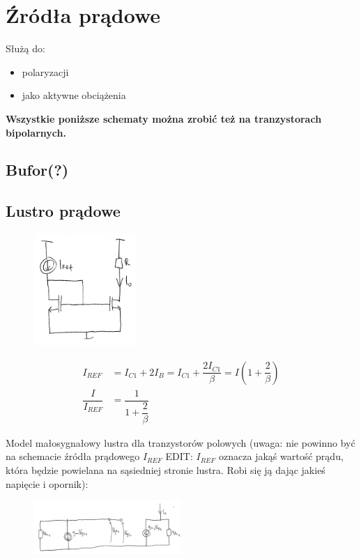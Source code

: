 \documentclass[10pt,a4paper]{article}
\begin{document}
\section{Źródła prądowe}
Służą do:
\begin{itemize}
\item{polaryzacji}
\item{jako aktywne obciążenia}
\end{itemize}
\textbf{Wszystkie poniższe schematy można zrobić też na tranzystorach bipolarnych.}

\subsection{Bufor(?)}

\subsection{Lustro prądowe}
\begin{figure}[H]
\centering
\includegraphics[width=0.35\textwidth]{lustro.png}
\end{figure}
\begin{align*}
I_{REF}&=I_{C1}+2I_B=I_{C1}+\dfrac{2I_{C1}}{\beta}=I(1+\dfrac{2}{\beta}) \\
\dfrac{I}{I_{REF}}&=\dfrac{1}{1+\dfrac{2}{\beta}}
\end{align*}

Model małosygnałowy lustra dla tranzystorów polowych (uwaga: nie powinno być na schemacie źródła prądowego $I_{REF}$ EDIT: $I_{REF}$ oznacza jakąś wartość prądu, która będzie powielana na sąsiedniej stronie lustra. Robi się ją dając jakieś napięcie i opornik):
\begin{figure}[H]
\centering
\includegraphics[width=0.5\textwidth]{lustr_wyp1.png}
\end{figure}
\end{document}
